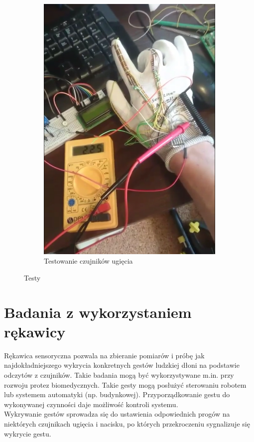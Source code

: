 \documentclass[12pt,a4paper]{article}
\begin{document}
\begin{figure}[htb!]
\begin{subfigure}{.5\textwidth}
	\includegraphics[width=.9\textwidth]{images/ugiecie.png}
	\caption{Testowanie czujników ugięcia}
	\label{fig:ugiecie}
\end{subfigure}
\caption{Testy}
\label{fig:testy}
\end{figure}

\newpage
\section{Badania z wykorzystaniem rękawicy}
Rękawica sensoryczna pozwala na zbieranie pomiarów i próbę jak najdokładniejszego wykrycia konkretnych gestów ludzkiej dłoni na podstawie odczytów z czujników. Takie badania mogą być wykorzystywane m.in. przy rozwoju protez biomedycznych. Takie gesty mogą posłużyć sterowaniu robotem lub systemem automatyki (np. budynkowej). Przyporządkowanie gestu do wykonywanej czynności daje możliwość kontroli systemu.\\
Wykrywanie gestów sprowadza się do ustawienia odpowiednich progów na niektórych czujnikach ugięcia i nacisku, po których przekroczeniu sygnalizuje się wykrycie gestu.\\
\end{document}
